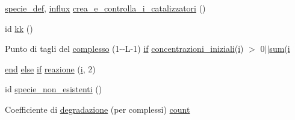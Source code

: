\begin{DoxyCompactItemize}
\hyperlink{a00062_a85d979dc881d9a49537b0f43daa2b360}{specie\-\_\-def}, \hyperlink{a00059_a902e747aeec6b345d3a057099152f41f}{influx} \hyperlink{a00062_a369160212da6ddc667d7c8e245ed8b24}{crea\-\_\-e\-\_\-controlla\-\_\-i\-\_\-catalizzatori} ()
\item 
id \hyperlink{a00062_a262053c6a2b2b257b33309d12f8f7ba7}{kk} ()
\item 
Punto di tagli del \hyperlink{a00062_ad4d1a2311b23c0f860b99297ddc57214}{complesso} (1-\/-\/L-\/1) \hyperlink{a00024_a01d55766b8058903dd360b4bda71f9f5}{if} \hyperlink{a00055_a89801fa89eee3ba40f6610f290d6f6c3}{concentrazioni\-\_\-iniziali}(\hyperlink{a00065_ad3efca1ea6e3333daf30719ee0501862}{i}) $>$ 0$|$$|$\hyperlink{a00058_a59a869fb2b28d56dacd91c09e1dffc8d}{sum}(\hyperlink{a00065_ad3efca1ea6e3333daf30719ee0501862}{i}
\item 
\hyperlink{a00019_afb358f48b1646c750fb9da6c6585be2b}{end} \hyperlink{a00025_af5946383720aa572eb93e1e63afc23c2}{else} \hyperlink{a00024_a01d55766b8058903dd360b4bda71f9f5}{if} \hyperlink{a00062_a65cf6e12ba9a8c10222f3f1f71f7c95f}{reazione} (\hyperlink{a00065_ad3efca1ea6e3333daf30719ee0501862}{i}, 2)
\item 
id \hyperlink{a00062_adfcfd2749a68fa87ece8ec3caa194b3d}{specie\-\_\-non\-\_\-esistenti} ()
\item 
Coefficiente di \hyperlink{a00062_a43a55a4e9faae78b56ddd9e7ca41ba42}{degradazione} (per complessi) \hyperlink{a00062_aa0a4866d2600caeb20cfacee8eefc922}{count}
\end{DoxyCompactItemize}
